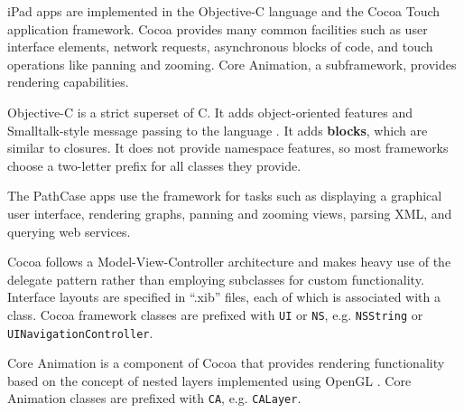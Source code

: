 iPad apps are implemented in the Objective-C language and the Cocoa Touch
application framework.  Cocoa provides many common facilities such as user
interface elements, network requests, asynchronous blocks of code, and touch
operations like panning and zooming. Core Animation, a subframework, provides
rendering capabilities.

Objective-C is a strict superset of C. It adds object-oriented features and
Smalltalk-style message passing to the language \cite[p.~9]{objc:manual}. It adds
\textbf{blocks}, which are similar to closures. It does not provide namespace
features, so most frameworks choose a two-letter prefix for all classes they
provide.

The PathCase apps use the framework for tasks such as displaying a graphical
user interface, rendering graphs, panning and zooming views, parsing XML, and
querying web services.

Cocoa follows a Model-View-Controller architecture and makes heavy use of the
delegate pattern rather than employing subclasses for custom functionality.
Interface layouts are specified in ``.xib'' files, each of which is associated
with a class. \cite{ios:application-programming-guide} Cocoa framework classes
are prefixed with \texttt{UI} or \texttt{NS}, e.g. \texttt{NSString} or
\texttt{UINavigationController}.

Core Animation is a component of Cocoa that provides rendering functionality
based on the concept of nested layers implemented using OpenGL
\cite{ios:core-animation}. Core Animation classes are prefixed with \texttt{CA},
e.g. \texttt{CALayer}.
